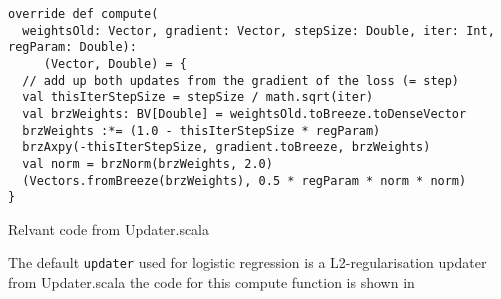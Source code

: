 \begin{listing}[H]
\begin{verbatim}
override def compute(
  weightsOld: Vector, gradient: Vector, stepSize: Double, iter: Int, regParam: Double):
     (Vector, Double) = {
  // add up both updates from the gradient of the loss (= step) 
  val thisIterStepSize = stepSize / math.sqrt(iter)
  val brzWeights: BV[Double] = weightsOld.toBreeze.toDenseVector
  brzWeights :*= (1.0 - thisIterStepSize * regParam)
  brzAxpy(-thisIterStepSize, gradient.toBreeze, brzWeights)
  val norm = brzNorm(brzWeights, 2.0)
  (Vectors.fromBreeze(brzWeights), 0.5 * regParam * norm * norm)
}
\end{verbatim}
\caption{Relvant code from Updater.scala}
\label{lst:updatercal}
\end{listing}

The default \texttt{updater} used for logistic regression is a L2-regularisation updater from Updater.scala
the code for this compute function is shown in 



